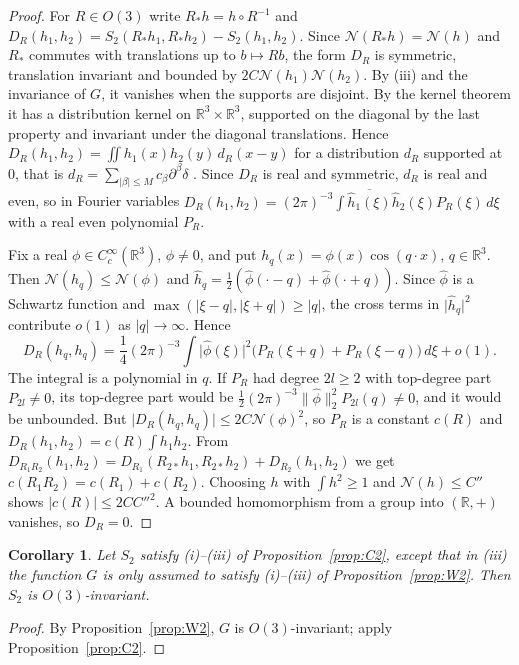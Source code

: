 \documentclass[11pt]{amsart}
\theoremstyle{plain}
\newtheorem{corollary}[theorem]{Corollary}
\theoremstyle{definition}
\theoremstyle{remark}
\numberwithin{equation}{section}
\newcommand{\R}{\mathbb{R}}
\newcommand{\abs}[1]{\lvert #1\rvert}
\newcommand{\norm}[1]{\lVert #1\rVert}
\begin{document}
\begin{proof}
For $R\in O(3)$ write $R_*h=h\circ R^{-1}$ and $D_R(h_1,h_2)=S_2(R_*h_1,R_*h_2)-S_2(h_1,h_2)$. Since $\mathcal N(R_*h)=\mathcal N(h)$ and $R_*$ commutes with translations up to $b\mapsto Rb$, the form $D_R$ is symmetric, translation invariant and bounded by $2C\mathcal N(h_1)\mathcal N(h_2)$. By (iii) and the invariance of $G$, it vanishes when the supports are disjoint. By the kernel theorem \cite[Thm.~5.2.1]{Ho} it has a distribution kernel on $\R^3\times\R^3$, supported on the diagonal by the last property and invariant under the diagonal translations. Hence $D_R(h_1,h_2)=\iint h_1(x)h_2(y)\,d_R(x-y)$ for a distribution $d_R$ supported at $0$, that is $d_R=\sum_{\abs\beta\le M}c_\beta\partial^\beta\delta$ \cite[Thm.~2.3.4]{Ho}. Since $D_R$ is real and symmetric, $d_R$ is real and even, so in Fourier variables $D_R(h_1,h_2)=(2\pi)^{-3}\int\overline{\hat h_1(\xi)}\hat h_2(\xi)P_R(\xi)\,d\xi$ with a real even polynomial $P_R$.

Fix a real $\phi\in C_c^\infty(\R^3)$, $\phi\ne0$, and put $h_q(x)=\phi(x)\cos(q\cdot x)$, $q\in\R^3$. Then $\mathcal N(h_q)\le\mathcal N(\phi)$ and $\hat h_q=\frac12(\hat\phi(\cdot-q)+\hat\phi(\cdot+q))$. Since $\hat\phi$ is a Schwartz function and $\max(\abs{\xi-q},\abs{\xi+q})\ge\abs q$, the cross terms in $\abs{\hat h_q}^2$ contribute $o(1)$ as $\abs q\to\infty$. Hence
\[
D_R(h_q,h_q)=\frac14(2\pi)^{-3}\int\abs{\hat\phi(\xi)}^2\big(P_R(\xi+q)+P_R(\xi-q)\big)\,d\xi+o(1).
\]
The integral is a polynomial in $q$. If $P_R$ had degree $2l\ge2$ with top-degree part $P_{2l}\ne0$, its top-degree part would be $\frac12(2\pi)^{-3}\norm{\hat\phi}_2^2P_{2l}(q)\ne0$, and it would be unbounded. But $\abs{D_R(h_q,h_q)}\le2C\mathcal N(\phi)^2$, so $P_R$ is a constant $c(R)$ and $D_R(h_1,h_2)=c(R)\int h_1h_2$. From $D_{R_1R_2}(h_1,h_2)=D_{R_1}(R_{2*}h_1,R_{2*}h_2)+D_{R_2}(h_1,h_2)$ we get $c(R_1R_2)=c(R_1)+c(R_2)$. Choosing $h$ with $\int h^2\ge1$ and $\mathcal N(h)\le C''$ shows $\abs{c(R)}\le2CC''^2$. A bounded homomorphism from a group into $(\R,+)$ vanishes, so $D_R=0$.
\end{proof}

\begin{corollary}\label{cor:W2}
Let $S_2$ satisfy (i)--(iii) of Proposition~\ref{prop:C2}, except that in (iii) the function $G$ is only assumed to satisfy (i)--(iii) of Proposition~\ref{prop:W2}. Then $S_2$ is $O(3)$-invariant.
\end{corollary}

\begin{proof}
By Proposition~\ref{prop:W2}, $G$ is $O(3)$-invariant; apply Proposition~\ref{prop:C2}.
\end{proof}
\end{document}

